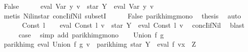 \begin{isabellebody}
\ False\isanewline
\ \ \ \ \isamarkupfalse%
\ {\isachardoublequoteopen}eval\ {\isacharparenleft}{\kern0pt}Var\ y{\isacharparenright}{\kern0pt}\ v\ {\isasymsubseteq}\ star\ Y\ {\isacharat}{\kern0pt}{\isacharat}{\kern0pt}\ eval\ {\isacharparenleft}{\kern0pt}Var\ y{\isacharparenright}{\kern0pt}\ v{\isachardoublequoteclose}\ \isamarkupfalse%
\ {\isacharparenleft}{\kern0pt}metis\ Nil{\isacharunderscore}{\kern0pt}in{\isacharunderscore}{\kern0pt}star\ concI{\isacharunderscore}{\kern0pt}if{\isacharunderscore}{\kern0pt}Nil{}\ subsetI{\isacharparenright}{\kern0pt}\isanewline
\ \ \ \ \isamarkupfalse%
\ False\ parikh{\isacharunderscore}{\kern0pt}img{\isacharunderscore}{\kern0pt}mono\ \isamarkupfalse%
\ {\isacharquery}{\kern0pt}thesis\ \isamarkupfalse%
\ auto\isanewline
\ \ \isamarkupfalse%
\isanewline
{}\isamarkupfalse%
\isanewline
\ \ \isamarkupfalse%
\ {\isacharparenleft}{\kern0pt}Const\ l{\isacharparenright}{\kern0pt}\isanewline
\ \ \isamarkupfalse%
\ {\isachardoublequoteopen}eval\ {\isacharparenleft}{\kern0pt}Const\ l{\isacharparenright}{\kern0pt}\ v\ {\isasymsubseteq}\ star\ Y\ {\isacharat}{\kern0pt}{\isacharat}{\kern0pt}\ eval\ {\isacharparenleft}{\kern0pt}Const\ l{\isacharparenright}{\kern0pt}\ v{\isachardoublequoteclose}\ \isamarkupfalse%
\ concI{\isacharunderscore}{\kern0pt}if{\isacharunderscore}{\kern0pt}Nil{}\ \isamarkupfalse%
\ blast\isanewline
\ \ \isamarkupfalse%
\ \isamarkupfalse%
\ {\isacharquery}{\kern0pt}case\ \isamarkupfalse%
\ {\isacharparenleft}{\kern0pt}simp\ add{\isacharcolon}{\kern0pt}\ parikh{\isacharunderscore}{\kern0pt}img{\isacharunderscore}{\kern0pt}mono{\isacharparenright}{\kern0pt}\isanewline
{}\isamarkupfalse%
\isanewline
\ \ \isamarkupfalse%
\ {\isacharparenleft}{\kern0pt}Union\ f\ g{\isacharparenright}{\kern0pt}\isanewline
\ \ \isamarkupfalse%
\ \isamarkupfalse%
\ {\isachardoublequoteopen}parikh{\isacharunderscore}{\kern0pt}img\ {\isacharparenleft}{\kern0pt}eval\ {\isacharparenleft}{\kern0pt}Union\ f\ g{\isacharparenright}{\kern0pt}\ v{\isacharparenright}{\kern0pt}\ {\isasymsubseteq}\ parikh{\isacharunderscore}{\kern0pt}img\ {\isacharparenleft}{\kern0pt}star\ Y\ {\isacharat}{\kern0pt}{\isacharat}{\kern0pt}\ eval\ f\ {\isacharparenleft}{\kern0pt}v{\isacharparenleft}{\kern0pt}x\ {\isacharcolon}{\kern0pt}{\isacharequal}{\kern0pt}\ Z{\isacharparenright}{\kern0pt}{\isacharparenright}{\kern0pt}\ {\isasymunion}\isanewline

\end{isabellebody}
